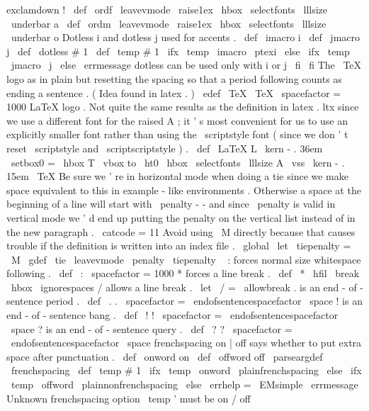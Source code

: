 {exclamdown
{
!
}
\
def
\
ordf
{
\
leavevmode
\
raise1ex
\
hbox
{
\
selectfonts
\
lllsize
\
underbar
{
a
}
}
}
\
def
\
ordm
{
\
leavevmode
\
raise1ex
\
hbox
{
\
selectfonts
\
lllsize
\
underbar
{
o
}
}
}
%
Dotless
i
and
dotless
j
used
for
accents
.
\
def
\
imacro
{
i
}
\
def
\
jmacro
{
j
}
\
def
\
dotless
#
1
{
%
\
def
\
temp
{
#
1
}
%
\
ifx
\
temp
\
imacro
\
ptexi
\
else
\
ifx
\
temp
\
jmacro
\
j
\
else
\
errmessage
{
dotless
can
be
used
only
with
i
or
j
}
%
\
fi
\
fi
}
%
The
\
TeX
{
}
logo
as
in
plain
but
resetting
the
spacing
so
that
a
%
period
following
counts
as
ending
a
sentence
.
(
Idea
found
in
latex
.
)
%
\
edef
\
TeX
{
\
TeX
\
spacefactor
=
1000
}
%
LaTeX
{
}
logo
.
Not
quite
the
same
results
as
the
definition
in
%
latex
.
ltx
since
we
use
a
different
font
for
the
raised
A
;
it
'
s
most
%
convenient
for
us
to
use
an
explicitly
smaller
font
rather
than
using
%
the
\
scriptstyle
font
(
since
we
don
'
t
reset
\
scriptstyle
and
%
\
scriptscriptstyle
)
.
%
\
def
\
LaTeX
{
%
L
\
kern
-
.
36em
{
\
setbox0
=
\
hbox
{
T
}
%
\
vbox
to
\
ht0
{
\
hbox
{
\
selectfonts
\
lllsize
A
}
\
vss
}
}
%
\
kern
-
.
15em
\
TeX
}
%
Be
sure
we
'
re
in
horizontal
mode
when
doing
a
tie
since
we
make
space
%
equivalent
to
this
in
example
-
like
environments
.
Otherwise
a
space
%
at
the
beginning
of
a
line
will
start
with
\
penalty
-
-
and
%
since
\
penalty
is
valid
in
vertical
mode
we
'
d
end
up
putting
the
%
penalty
on
the
vertical
list
instead
of
in
the
new
paragraph
.
{
\
catcode
=
11
%
Avoid
using
\
M
directly
because
that
causes
trouble
%
if
the
definition
is
written
into
an
index
file
.
\
global
\
let
\
tiepenalty
=
\
M
\
gdef
\
tie
{
\
leavevmode
\
penalty
\
tiepenalty
\
}
}
%
:
forces
normal
size
whitespace
following
.
\
def
\
:
{
\
spacefactor
=
1000
}
%
*
forces
a
line
break
.
\
def
\
*
{
\
hfil
\
break
\
hbox
{
}
\
ignorespaces
}
%
/
allows
a
line
break
.
\
let
\
/
=
\
allowbreak
%
.
is
an
end
-
of
-
sentence
period
.
\
def
\
.
{
.
\
spacefactor
=
\
endofsentencespacefactor
\
space
}
%
!
is
an
end
-
of
-
sentence
bang
.
\
def
\
!
{
!
\
spacefactor
=
\
endofsentencespacefactor
\
space
}
%
?
is
an
end
-
of
-
sentence
query
.
\
def
\
?
{
?
\
spacefactor
=
\
endofsentencespacefactor
\
space
}
%
frenchspacing
on
|
off
says
whether
to
put
extra
space
after
punctuation
.
%
\
def
\
onword
{
on
}
\
def
\
offword
{
off
}
%
\
parseargdef
\
frenchspacing
{
%
\
def
\
temp
{
#
1
}
%
\
ifx
\
temp
\
onword
\
plainfrenchspacing
\
else
\
ifx
\
temp
\
offword
\
plainnonfrenchspacing
\
else
\
errhelp
=
\
EMsimple
\
errmessage
{
Unknown
frenchspacing
option
\
temp
'
must
be
on
/
off
}
}}
